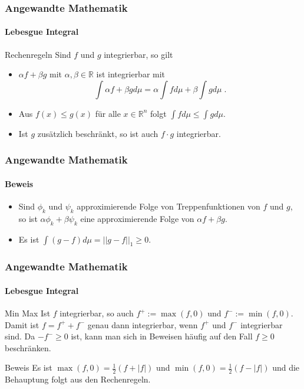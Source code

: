\documentclass{beamer}
\begin{document}
\begin{frame}
    \frametitle{Angewandte Mathematik}
\framesubtitle{Lebesgue Integral}
    \begin{block}{Rechenregeln}
Sind $f$ und $g$ integrierbar, so gilt
\begin{itemize}
\item $ \alpha f + \beta g$ mit $\alpha, \beta \in \mathbb{R}$ ist integrierbar mit 
$$\int \alpha f + \beta g d\mu = \alpha \int f d\mu + \beta \int g d \mu \; .$$ 
\item Aus $f(x) \leq g(x)$ für alle $x \in \mathbb{R}^n$ folgt $\int f d \mu \leq \int g d \mu$.
\item Ist $g$ zusätzlich beschränkt, so ist auch $f \cdot g$ integrierbar.
\end{itemize}

\end{block}

 \end{frame}


\begin{frame}
    \frametitle{Angewandte Mathematik}
\framesubtitle{Beweis}
\begin{itemize}
\item Sind $\phi_k$ und $\psi_k$ approximierende Folge von  Treppenfunktionen von $f$ und $g$, so ist $\alpha \phi_k + \beta \psi_k$ eine approximierende Folge von $\alpha f + \beta g$.
\item Es  ist $\int (g-f) d \mu = || g - f ||_1 \geq 0$.
\end{itemize}
 \end{frame}




\begin{frame}
    \frametitle{Angewandte Mathematik}
\framesubtitle{Lebesgue Integral}
    \begin{block}{Min Max}
Ist $f$ integrierbar, so auch $f^+ := \max(f,0)$ und $f^- := \min(f,0)$. Damit ist $f = f^+ + f^-$ genau dann integrierbar, wenn $f^+$ und $f^-$ integrierbar sind. Da $- f^- \geq 0$ ist, kann man sich in Beweisen häufig auf den Fall $f \geq 0$ beschränken.
\end{block}
    \begin{block}{Beweis}
Es ist $ \max(f,0) = \frac{1}{2} (f + | f |)$ und  $ \min(f,0) = \frac{1}{2} (f - | f |)$ und die Behauptung folgt aus den Rechenregeln.

\end{block}
 \end{frame}
\end{document}
